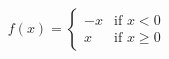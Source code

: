 \documentclass[preview]{standalone}
\begin{document}
\begin{align*}
f( x ) = \begin{cases}
         -x  &  \text{if } x < 0  \\
         x  &  \text{if } x \geq 0 
        \end{cases}
\end{align*}
\end{document}
